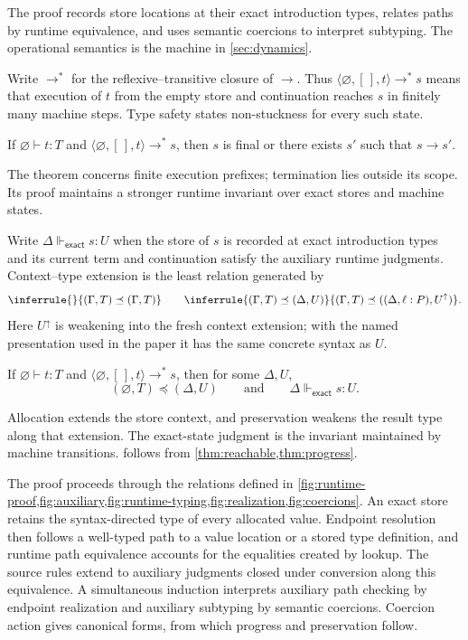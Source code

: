 \documentclass[acmsmall,screen,nonacm]{acmart}
\newcommand{\ctxempty}{\varnothing}
\newcommand{\steps}{\longrightarrow^{*}}
\newcommand{\sstep}{\longrightarrow}
\newcommand{\struct}{\Vdash}
\newcommand{\exact}{\mathsf{exact}}
\begin{document}
The proof records store locations at their exact introduction types, relates
paths by runtime equivalence, and uses semantic coercions to interpret
subtyping. The operational semantics is the machine in
\cref{sec:dynamics}.

Write \(\steps\) for the reflexive--transitive closure of \(\sstep\).
Thus \(\langle\varnothing,[\,],t\rangle\steps s\) means that execution of
\(t\) from the empty store and continuation reaches \(s\) in finitely many
machine steps. Type safety states non-stuckness for every such state.

\begin{theorem}
\label{thm:safety}
If \(\ctxempty\vdash t:T\) and
\(\langle\varnothing,[\,],t\rangle\steps s\), then
\(s\) is final or there exists \(s'\) such that \(s\sstep s'\).
\end{theorem}

The theorem concerns finite execution prefixes; termination lies outside its
scope. Its proof maintains a stronger runtime invariant over exact stores and
machine states.

Write \(\Delta\struct_{\exact}s:U\) when the store of \(s\) is recorded at
exact introduction types and its current term and continuation satisfy the
auxiliary runtime judgments. Context--type extension is the least relation
generated by
\[
\inferrule
  { }
  {(\Gamma,T)\preceq(\Gamma,T)}
\qquad
\inferrule
  {(\Gamma,T)\preceq(\Delta,U)}
  {(\Gamma,T)\preceq((\Delta,\ell:P),U^\uparrow)}.
\]
Here \(U^\uparrow\) is weakening into the fresh context extension; with the
named presentation used in the paper it has the same concrete syntax as
\(U\).

\begin{theorem}
\label{thm:reachable}
If \(\ctxempty\vdash t:T\) and
\(\langle\varnothing,[\,],t\rangle\steps s\), then for some
\(\Delta,U\),
\[
(\ctxempty,T)\preceq(\Delta,U)
\qquad\text{and}\qquad
\Delta\struct_{\exact}s:U.
\]
\end{theorem}

Allocation extends the store context, and preservation weakens the result type
along that extension. The exact-state judgment is the invariant maintained by
machine transitions.  follows from
\cref{thm:reachable,thm:progress}.

The proof proceeds through the relations defined in
\cref{fig:runtime-proof,fig:auxiliary,fig:runtime-typing,fig:realization,fig:coercions}.
An exact store retains the syntax-directed type of every allocated value.
Endpoint resolution then
follows a well-typed path to a value location or a stored type definition,
and runtime path equivalence accounts for the equalities created by lookup.
The source rules extend to auxiliary judgments closed under conversion along
this equivalence. A simultaneous induction interprets auxiliary path checking
by endpoint realization and auxiliary subtyping by semantic coercions.
Coercion action gives canonical forms, from which progress and preservation
follow.
\end{document}
